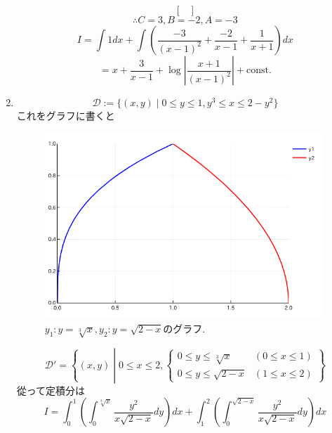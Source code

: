 \documentclass[a4paper,10pt,report]{amsart}
\theoremstyle{plain}
\theoremstyle{definition}
\theoremstyle{remark}
\begin{document}
\begin{enumerate}
\begin{equation*}
\begin{bmatrix}
            \end{bmatrix}
        \end{equation*}
        \begin{equation*}
            \therefore C=3,B=-2,A=-3
        \end{equation*}
        \begin{equation*}
            I=\int1dx+\int\left(\frac{-3}{{(x-1)}^{2}}+\frac{-2}{x-1}+\frac{1}{x+1}\right)dx
        \end{equation*}
        \begin{equation*}
            =x+\frac{3}{x-1}+\log\left|\frac{x+1}{{(x-1)}^{2}}\right|+\mathrm{const.}
        \end{equation*}
        \item
        \begin{equation*}
            \mathcal{D}:=\{(x,y)\mid0\leq y\leq 1,y^{3}\leq x\leq 2-y^{2}\}
        \end{equation*}
        これをグラフに書くと
        \begin{figure}[tbh]
            \centering
            \includegraphics[height=7cm]{newplot.png}
            \caption{\(y_{1}:y=\sqrt[3]{x},y_{2}:y=\sqrt{2-x}\)のグラフ. }
        \end{figure}
        \begin{equation*}
            \mathcal{D}'=\left \{(x,y)\middle|0\leq x\leq 2,
            \begin{cases}
                0\leq y\leq \sqrt[3]{x}&(0\leq x\leq 1) \\
                0\leq y\leq \sqrt{2-x}&(1\leq x\leq 2)
            \end{cases}
            \right \}
        \end{equation*}
        從って定積分は
        \begin{equation*}
            I=\int_{0}^{1}\left(\int_{0}^{\sqrt[3]{x}}\frac{y^{2}}{x\sqrt{2-x}}dy\right)dx+\int_{1}^{2}\left(\int_{0}^{\sqrt{2-x}}\frac{y^{2}}{x\sqrt{2-x}}dy\right)dx

\end{equation*}
\end{enumerate}
\end{document}
